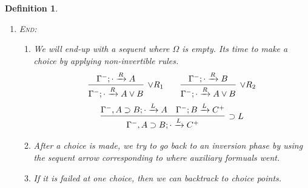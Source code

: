 \documentclass{article}
\theoremstyle{plain}
\newtheorem{definition}[theorem]{Definition}
\newcounter{case}
\theoremstyle{nonumberplain}
\begin{document}
\begin{definition}
\begin{enumerate}
\begin{enumerate}
$$\begin{gathered}
		\infer[\wedge L]{\Gamma^-; \Omega, A\wedge B \xrightarrow{L} C^+}{\Gamma^-; \Omega, A, B \xrightarrow{L}C^+}\\
		\infer[\vee L]{\Gamma^-; \Omega, A \vee B \xrightarrow{L} C^+}{\Gamma^-; \Omega,A \xrightarrow{L} C^+& \Gamma^-; \Omega,B \xrightarrow{L} C^+}
		\end{gathered}
		$$
		\item If the first formual in $\Omega$ is $\perp$, we can close the branch; If it is $\top$ we can  remove it form our list.
		$$
		\begin{gathered}
		\infer[\perp L]{\Gamma^-; \Omega,\perp \xrightarrow{L} C^+}{} \\
		\infer[\top L]{\Gamma^-; \Omega, \top \xrightarrow{L} C^+}{\Gamma^-; \Omega  \xrightarrow{L} C^+}
		\end{gathered}
		$$
		\item If we encounter an atom, we can close the branch if it is equal to the right side or we can move it. and only case left is an implication, we also can move it to $\Gamma^-$. 
		$$
		\begin{gathered}
		\infer[init]{\Gamma^-; \Omega,P \xrightarrow{L} P}{} \\
		\infer[\text{shift}_P]{\Gamma^-; \Omega,P \xrightarrow{L} C^+}{\Gamma^-, P; \Omega \xrightarrow{L} C^+} \\
		\infer[\text{shift}_\supset]{\Gamma^-; \Omega,A \supset B \xrightarrow{L} C^+}{\Gamma^-,A \supset B; \Omega \xrightarrow{L} C^+} \\
		\end{gathered}
		$$
	\end{enumerate}
	\item \textsc{End}: 
	\begin{enumerate}
		\item We will end-up with a sequent where $\Omega$ is empty. Its time to make a choice by applying non-invertible rules.
	$$
	\begin{gathered}
	\begin{aligned}
	\infer[\vee R_1]{\Gamma^-;\cdot \xrightarrow{R} A \vee B}{\Gamma^-;\cdot \xrightarrow{R} A} &&&& \infer[\vee R_2]{\Gamma^-;\cdot \xrightarrow{R} A \vee B}{\Gamma^-;\cdot \xrightarrow{R} B} 
	\end{aligned}\\
	\infer[\supset L]{\Gamma^-, A \supset B;\cdot \xrightarrow{L} C^+}{\Gamma^-, A \supset B;\cdot \xrightarrow{L} A & \Gamma^-;B \xrightarrow{L} C^+}	
	\end{gathered}
	$$
		\item After a choice is made, we try to go back to an inversion phase by using the sequent arrow corresponding to where auxiliary formuals went.
		\item If it is failed at one choice, then we can backtrack to choice points. 
	\end{enumerate}
\end{enumerate}
\end{definition}
\end{document}
